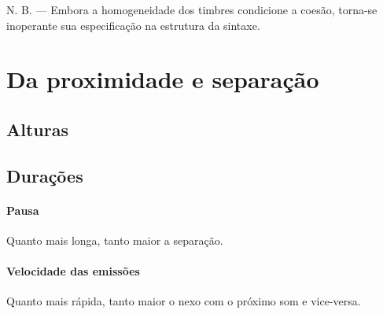 \documentclass[a4paper]{book}
\begin{document}
N. B. --- Embora a homogeneidade dos timbres condicione a coesão, torna-se inoperante sua especificação na estrutura da sintaxe.

\chapter{Da proximidade e separação}

\section*{Alturas}

\begin{center}
\end{center}

\section*{Durações}

\subsubsection*{Pausa}

Quanto mais longa, tanto maior a separação.

\subsubsection*{Velocidade das emissões}

Quanto mais rápida, tanto maior o nexo com o próximo som e vice-versa.
\end{document}
